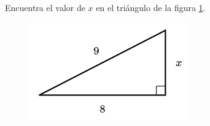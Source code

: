 Encuentra el valor de $x$ en el triángulo de la figura \ref{fig:lados_pitagoras_34}.

\begin{minipage}[t][][t]{0.35\textwidth}
    \begin{figure}[H]
        \centering
        \includegraphics[width=0.9\linewidth]{../images/lados_pitagoras_34.png}
        \caption{}
        \label{fig:lados_pitagoras_34}
    \end{figure}
\end{minipage}\hfill
